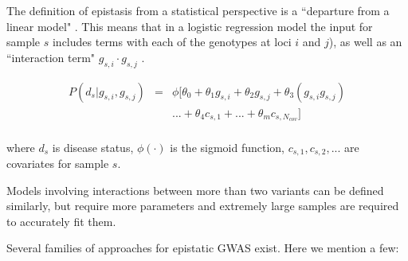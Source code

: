 %

The definition of epistasis from a statistical perspective is a ``departure from a linear model" \cite{cordell2009detecting}. This means that in a logistic regression model the input for sample $s$ includes terms with each of the genotypes at loci $i$ and $j$), as well as an ``interaction term" $g_{s,i} \cdot g_{s,j}$ \cite{cordell2002epistasis}. 

\begin{eqnarray*} \label{eq:gwasLogRegH1}
    P( d_s | g_{s,i},g_{s,j}) & = & \phi[ \theta_0 + \theta_1 g_{s,i} + \theta_2 g_{s,j} + \theta_3 (g_{s,i} g_{s,j}) \\
    & & ... + \theta_4 c_{s,1} + ... + \theta_m c_{s,N_{cov}} ] \\
\end{eqnarray*}

where $d_s$ is disease status, $\phi(\cdot)$ is the sigmoid function, $c_{s,1}, c_{s,2}, ... $ are covariates for sample $s$.

Models involving interactions between more than two variants can be defined similarly, but require more parameters and extremely large samples are required to accurately fit them.

Several families of approaches for epistatic GWAS exist. Here we mention a few:

